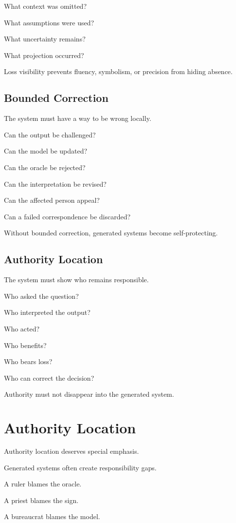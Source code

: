 \documentclass[11pt]{book}
\begin{document}
What context was omitted?

What assumptions were used?

What uncertainty remains?

What projection occurred?

Loss visibility prevents fluency, symbolism, or precision from hiding absence.

\subsection{Bounded Correction}

The system must have a way to be wrong locally.

Can the output be challenged?

Can the model be updated?

Can the oracle be rejected?

Can the interpretation be revised?

Can the affected person appeal?

Can a failed correspondence be discarded?

Without bounded correction, generated systems become self-protecting.

\subsection{Authority Location}

The system must show who remains responsible.

Who asked the question?

Who interpreted the output?

Who acted?

Who benefits?

Who bears loss?

Who can correct the decision?

Authority must not disappear into the generated system.

\section{Authority Location}

Authority location deserves special emphasis.

Generated systems often create responsibility gaps.

A ruler blames the oracle.

A priest blames the sign.

A bureaucrat blames the model.
\end{document}
